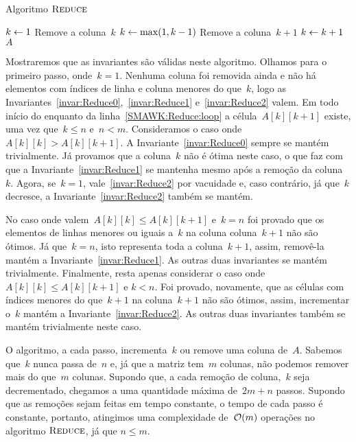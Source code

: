 \newcommand{\Reduce}{\textsc{Reduce}}
\begin{algorithm}[H]
\caption{Algoritmo $\Reduce$}
\label{SMAWK:algo:Reduce}
\begin{algorithmic}[1]
\Function{\Reduce}{A}
    \State $k \leftarrow 1$
     \label{SMAWK:Reduce:loop}
            \State Remove a coluna~$k$
            \State $k \leftarrow \max(1,k-1)$
        \Else
                \State Remove a coluna~$k+1$
            \Else
                \State $k \leftarrow k+1$
            \EndIf
        \EndIf
    \EndWhile
    \State \Return $A$
\EndFunction
\end{algorithmic}
\end{algorithm}

Mostraremos que as invariantes são válidas neste algoritmo. Olhamos para o primeiro passo, onde~$k = 1$. Nenhuma coluna foi removida ainda e não há elementos com índices de linha e coluna menores do que~$k$, logo as Invariantes~\eqref{invar:Reduce0},~\eqref{invar:Reduce1} e~\eqref{invar:Reduce2} valem. Em todo início do enquanto da linha~\ref{SMAWK:Reduce:loop} a célula~$A[k][k+1]$ existe, uma vez que~${ k \leq n }$ e~${ n < m }$. Consideramos o caso onde~${ A[k][k] > A[k][k+1] }$. A Invariante~\eqref{invar:Reduce0} sempre se mantém trivialmente. Já provamos que a coluna~$k$ não é ótima neste caso, o que faz com que a Invariante~\eqref{invar:Reduce1} se mantenha mesmo após a remoção da coluna~$k$. Agora, se~${ k=1 }$, vale~\eqref{invar:Reduce2} por vacuidade e, caso contrário, já que~$k$ decresce, a Invariante~\eqref{invar:Reduce2} também se mantém. 

No caso onde valem~$A[k][k] \leq A[k][k+1]$ e~$k = n$ foi provado que os elementos de linhas menores ou iguais a~$k$ na coluna coluna~$k+1$ não são ótimos. Já que~${ k = n }$, isto representa toda a coluna~${ k+1 }$, assim, removê-la mantém a Invariante~\eqref{invar:Reduce1}. As outras duas invariantes se mantém trivialmente. Finalmente, resta apenas considerar o caso onde~$A[k][k] \leq A[k][k+1]$ e $k < n$. Foi provado, novamente, que as células com índices menores do que~${ k + 1 }$ na coluna~${ k + 1 }$ não são ótimos, assim, incrementar o~$k$ mantém a Invariante~\eqref{invar:Reduce2}. As outras duas invariantes também se mantém trivialmente neste caso. 

O algoritmo, a cada passo, incrementa~$k$ ou remove uma coluna de~$A$. Sabemos que~$k$ nunca passa de~$n$ e, já que a matriz tem~$m$ colunas, não podemos remover mais do que~$m$ colunas. Supondo que, a cada remoção de coluna,~$k$ seja decrementado, chegamos a uma quantidade máxima de~$2m + n$ passos. Supondo que as remoções sejam feitas em tempo constante, o tempo de cada passo é constante, portanto, atingimos uma complexidade de~$\mathcal{O}(m)$ operações no algoritmo $\Reduce$, já que $n \leq m$.

